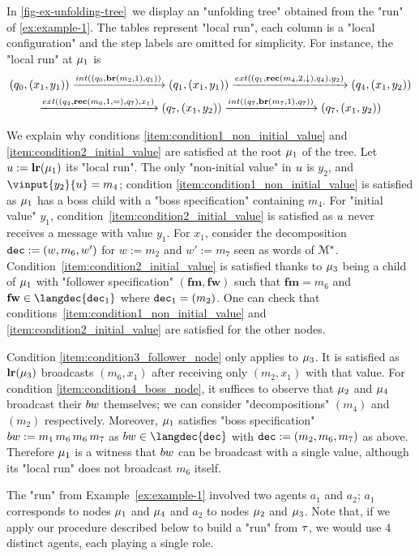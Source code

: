 \begin{example}
	In \cref{fig-ex-unfolding-tree}~we display an "unfolding tree" obtained from the "run" of \cref{ex:example-1}. The tables represent "local run", each column is a "local configuration" and the step labels are omitted for simplicity. For instance, the "local run" at $\mu_1$ is \vspace{-0,2cm} \begin{multline*} 
	(q_0, (x_1,y_1)) \intstep{(q_0, \br{m_2}{1},q_1)} (q_1, (x_1, y_1)) \extbr{(q_1, \rec{m_4}{2}{\enregact}, q_4)}{y_2} (q_4, (x_1, y_2)) \\ \extbr{(q_4, \rec{m_6}{1}{\eqtestact}, q_7)}{x_1} (q_7, (x_1, y_2)) \intstep{(q_7, \br{m_7}{1},q_7)} (q_7, (x_1, y_2)) \end{multline*} \vspace{-0,6cm}
	
	We explain why conditions \ref{item:condition1_non_initial_value} and \ref{item:condition2_initial_value} are satisfied at the root $\mu_1$ of the tree. Let $u := \mathbf{lr}(\mu_1)$ its "local run". 
	The only "non-initial value" in $u$ is $y_2$, and $\vinput{y_2}{\localrun} = m_4$; condition \ref{item:condition1_non_initial_value} is satisfied as $\mu_1$ has a boss child with a "boss specification" containing $m_4$. 
	For "initial value" $y_1$, condition~\ref{item:condition2_initial_value} is satisfied as $u$ never receives a message with value $y_1$. For $x_1$, consider the decomposition $\mathtt{dec} := (w, m_6, w')$ for $w:= m_2$ and $w' := m_7$ seen as words of $\mathcal{M}^*$. Condition~\ref{item:condition2_initial_value} is satisfied thanks to $\mu_3$ being a child of $\mu_1$ with "follower specification" $(\mathbf{fm}, \mathbf{fw})$ such that $\mathbf{fm} = m_6$ and $\mathbf{fw} \in \langdec{\decsymb_1}$ where $\mathtt{dec}_1 = (m_2)$. One can check that conditions~\ref{item:condition1_non_initial_value} and \ref{item:condition2_initial_value} are satisfied for the other nodes. 
	
	Condition \ref{item:condition3_follower_node} only applies to $\mu_3$. It is satisfied as $\mathbf{lr}(\mu_3)$ broadcasts $(m_6,x_1)$ after receiving only $(m_2,x_1)$ with that value. 
	For condition \ref{item:condition4_boss_node}, it suffices to observe that $\mu_2$ and $\mu_4$ broadcast their $\bossspec$ themselves; we can consider "decompositions" $(m_4)$ and $(m_2)$ respectively. Moreover, $\mu_1$ satisfies "boss specification" $\bossspec:= m_1 \, m_6 \, m_6 \, m_7$ as $\bossspec \in \langdec{\decsymb}$ with $\mathtt{dec} := (m_2, m_6, m_7)$ as above. Therefore $\mu_1$ is a witness that $\bossspec$ can be broadcast with a single value, although its "local run" does not broadcast $m_6$ itself. 
	
	The "run" from Example~\ref{ex:example-1} involved two agents $a_1$ and $a_2$; $a_1$ corresponds to nodes $\mu_1$ and $\mu_4$ and $a_2$ 
	to nodes $\mu_2$ and $\mu_3$. Note that, if we apply our procedure described below to build a "run" from $\tau$, we would use $4$ distinct agents, each playing a single role.
\end{example}


